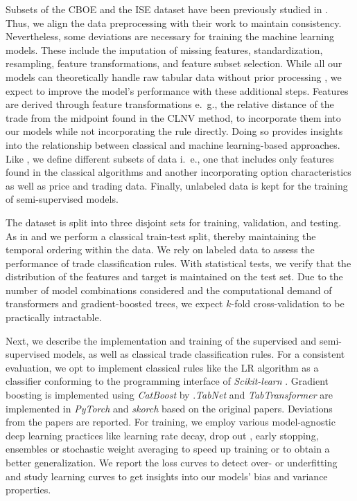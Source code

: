 Subsets of the \gls{CBOE} and the \gls{ISE} dataset have been previously studied in \textcite{grauerOptionTradeClassification2022}. Thus, we align the data preprocessing with their work to maintain consistency. Nevertheless, some deviations are necessary for training the machine learning models. These include the imputation of missing features, standardization, resampling, feature transformations, and feature subset selection. While all our models can theoretically handle raw tabular data without prior processing \autocites{arikTabNetAttentiveInterpretable2020}{prokhorenkovaCatBoostUnbiasedBoosting2018}{huangTabTransformerTabularData2020}, we expect to improve the model's performance with these additional steps. Features are derived through feature transformations e.~g., the relative distance of the trade from the midpoint found in the \gls{CLNV} method, to incorporate them into our models while not incorporating the rule directly. Doing so provides insights into the relationship between classical and machine learning-based approaches. Like \textcite{ronenMachineLearningTrade2022}, we define different subsets of data i.~e., one that includes only features found in the classical algorithms and another incorporating option characteristics as well as price and trading data. Finally, unlabeled data is kept for the training of semi-supervised models.

The dataset is split into three disjoint sets for training, validation, and testing. As in \textcite{ellisAccuracyTradeClassification2000} and \textcite{ronenMachineLearningTrade2022} we perform a classical train-test split, thereby maintaining the temporal ordering within the data. We rely on labeled data to assess the performance of trade classification rules. With statistical tests, we verify that the distribution of the features and target is maintained on the test set. Due to the number of model combinations considered and the computational demand of transformers and gradient-boosted trees, we expect $k$-fold cross-validation to be practically intractable.

Next, we describe the implementation and training of the supervised and semi-supervised models, as well as classical trade classification rules. 
For a consistent evaluation, we opt to implement classical rules like the \gls{LR} algorithm as a classifier conforming to the programming interface of \emph{Scikit-learn} \autocite{pedregosaScikitlearnMachineLearning2018}.
Gradient boosting is implemented using \emph{CatBoost} by \textcite{prokhorenkovaCatBoostUnbiasedBoosting2018}.\emph{TabNet} and \emph{TabTransformer} are implemented in \emph{PyTorch} \autocite{paszkePyTorchImperativeStyle2019} and \emph{skorch} based on the original papers. Deviations from the papers are reported.
For training, we employ various model-agnostic deep learning practices like learning rate decay, drop out \autocite{hintonImprovingNeuralNetworks2012}, early stopping, ensembles \autocite{huangSnapshotEnsemblesTrain2017} or stochastic weight averaging \autocite{izmailovAveragingWeightsLeads2019} to speed up training or to obtain a better generalization. We report the loss curves to detect over- or underfitting and study learning curves to get insights into our models' bias and variance properties.  

